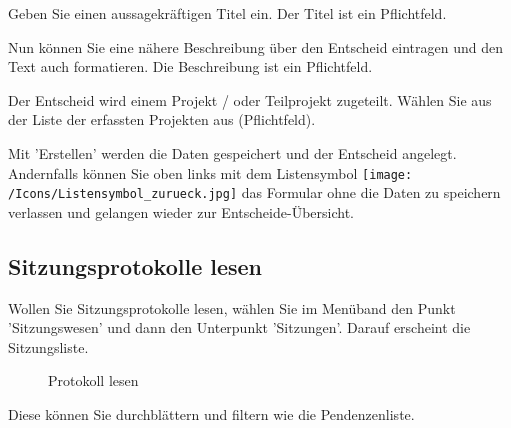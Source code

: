 \begin{compactitem}
	\item Geben Sie einen aussagekräftigen Titel ein. Der Titel ist ein Pflichtfeld.
	\item Nun können Sie eine nähere Beschreibung über den Entscheid eintragen und den Text auch formatieren. Die Beschreibung ist ein Pflichtfeld.
	\item Der Entscheid wird einem Projekt / oder Teilprojekt zugeteilt. Wählen Sie aus der Liste der erfassten Projekten aus (Pflichtfeld).
	\item Mit 'Erstellen' werden die Daten gespeichert und der Entscheid angelegt. Andernfalls können Sie oben links mit dem Listensymbol \texttt{[image: /Icons/Listensymbol\_zurueck.jpg]} das Formular ohne die Daten zu speichern verlassen und gelangen wieder zur Entscheide-Übersicht.

\end{compactitem}

\clearpage

\subsection{Sitzungsprotokolle lesen}

Wollen Sie Sitzungsprotokolle lesen, wählen Sie im Menüband den Punkt 'Sitzungswesen' und dann den Unterpunkt 'Sitzungen'. Darauf erscheint die Sitzungsliste.

\begin{figure}[H]
\caption{Protokoll lesen}
\end{figure}

Diese können Sie durchblättern und filtern wie die Pendenzenliste.

